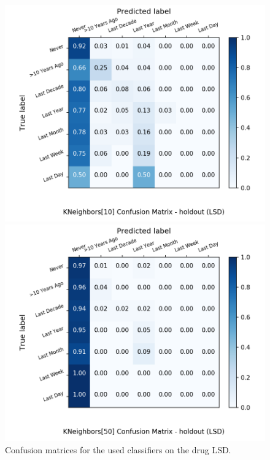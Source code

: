 \begin{figure}[H]
\begin{minipage}[b]{0.32\textwidth}
		\includegraphics[width=1.1\textwidth]{Plots/LSD_KNeighbors_10_balance_False_holdout.png}
  \end{minipage}
	\begin{minipage}[b]{0.32\textwidth}
		\includegraphics[width=1.1\textwidth]{Plots/LSD_KNeighbors_50_balance_False_holdout.png}
  \end{minipage}
	\caption{Confusion matrices for the used classifiers on the drug LSD.}
\end{figure}

